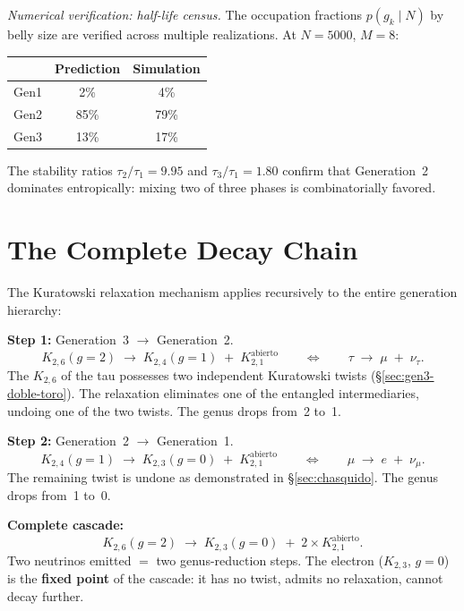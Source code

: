 \noindent\textit{Numerical verification: half-life census.}\enspace
The occupation fractions $p(g_k \mid N)$ by belly size
are verified across multiple realizations.
At $N = 5000$, $M = 8$:
\begin{center}
\renewcommand{\arraystretch}{1.2}
\begin{tabular}{lcc}
\toprule
& \textbf{Prediction} & \textbf{Simulation} \\
\midrule
Gen1 & 2\% & 4\% \\
Gen2 & 85\% & 79\% \\
Gen3 & 13\% & 17\% \\
\bottomrule
\end{tabular}
\end{center}
The stability ratios $\tau_2/\tau_1 = 9{.}95$ and
$\tau_3/\tau_1 = 1{.}80$ confirm that Generation~2 dominates
entropically: mixing two of three phases is combinatorially
favored.

\section{The Complete Decay Chain}
\label{sec:cadena-completa}

The Kuratowski relaxation mechanism applies recursively to the entire
generation hierarchy:

\medskip
\noindent
\textbf{Step 1:} Generation~3 $\to$ Generation~2.
\[
  K_{2,6}(g = 2) \;\longrightarrow\; K_{2,4}(g = 1) \;+\; K_{2,1}^{\mathrm{abierto}}
  \qquad\Longleftrightarrow\qquad
  \tau \;\longrightarrow\; \mu \;+\; \nu_\tau.
\]
The $K_{2,6}$ of the tau possesses two independent Kuratowski twists
(\S\ref{sec:gen3-doble-toro}). The relaxation eliminates one of the
entangled intermediaries, undoing one of the two twists. The genus
drops from~2 to~1.

\medskip
\noindent
\textbf{Step 2:} Generation~2 $\to$ Generation~1.
\[
  K_{2,4}(g = 1) \;\longrightarrow\; K_{2,3}(g = 0) \;+\; K_{2,1}^{\mathrm{abierto}}
  \qquad\Longleftrightarrow\qquad
  \mu \;\longrightarrow\; e \;+\; \nu_\mu.
\]
The remaining twist is undone as demonstrated in
\S\ref{sec:chasquido}. The genus drops from~1 to~0.

\medskip
\noindent
\textbf{Complete cascade:}
\[
  K_{2,6}(g = 2) \;\longrightarrow\;
  K_{2,3}(g = 0) \;+\; 2 \times K_{2,1}^{\mathrm{abierto}}.
\]
Two neutrinos emitted $=$ two genus-reduction steps. The
electron ($K_{2,3}$, $g = 0$) is the \textbf{fixed point} of the
cascade: it has no twist, admits no relaxation, cannot decay further.

